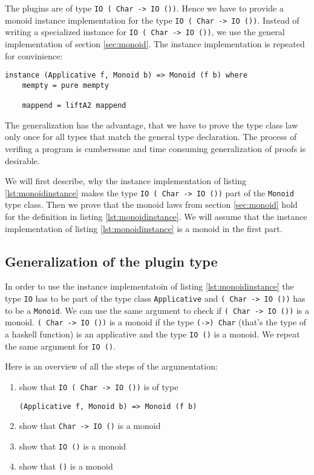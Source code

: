 The plugins are of type \verb|IO ( Char -> IO ())|. Hence we have to provide a monoid instance implementation for the type \verb|IO ( Char -> IO ())|. Instead of writing a specialized instance for \verb|IO ( Char -> IO ())|, we use the general implementation of section \ref{sec:monoid}.
The instance implementation is repeated for convinience:

\begin{lstlisting}[caption={Monoid instance},label={lst:monoidinstance}]
instance (Applicative f, Monoid b) => Monoid (f b) where
    mempty = pure mempty

    mappend = liftA2 mappend
\end{lstlisting}
The generalization has the advantage, that we have to prove the type class law only once for all types that match the general type declaration. The process of verifing a program is cumbersome and time consuming generalization of proofs is desirable.

We will first describe, why the instance implementation of listing \ref{lst:monoidinstance} makes the type \verb|IO ( Char -> IO ())| part of the \verb|Monoid| type class. Then we prove that the monoid laws from section \ref{sec:monoid} hold for the definition in listing \ref{lst:monoidinstance}. We will assume that the instance implementation of listing \ref{lst:monoidinstance} is a monoid in the first part.

\subsection{Generalization of the plugin type }
\label{sec:generalization}

In order to use the instance implementatoin of listing \ref{lst:monoidinstance} the type \verb|IO| has to be part of the type class \verb|Applicative| and \verb|( Char -> IO ())| has to be a \verb|Monoid|. We can use the same argument to check if \verb|( Char -> IO ())|  is a monoid. \verb|( Char -> IO ())| is a monoid if the type \verb|(->) Char| (that's the type of a haskell function) is an applicative and the type \verb|IO ()| is a monoid. We repeat the same argument for \verb|IO ()|.

Here is an overview of all the steps of the argumentation:
\begin{enumerate}
\item show that  \verb|IO ( Char -> IO ())| is of type 
\begin{verbatim}
(Applicative f, Monoid b) => Monoid (f b)
\end{verbatim}
\item show that \verb|Char -> IO ()| is a monoid
\item show that \verb|IO ()| is a monoid
\item show that \verb|()| is a monoid
\end{enumerate}

